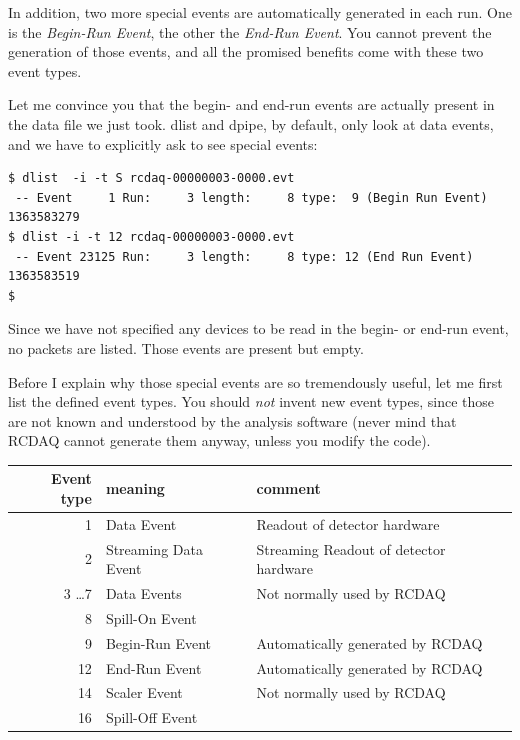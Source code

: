 \documentclass{article}[11pt]
\begin{document}
In addition, two more special events are automatically generated in
each run.  One is the \emph{Begin-Run Event}, the other the
\emph{End-Run Event}. You cannot prevent the generation of those
events, and all the promised benefits come with these two event types.

Let me convince you that the begin- and end-run events are actually present in
the data file we just took. dlist and dpipe, by default, only look at
data events, and we have to explicitly ask to see special events:

\begin{verbatim}
$ dlist  -i -t S rcdaq-00000003-0000.evt
 -- Event     1 Run:     3 length:     8 type:  9 (Begin Run Event)  1363583279
$ dlist -i -t 12 rcdaq-00000003-0000.evt
 -- Event 23125 Run:     3 length:     8 type: 12 (End Run Event)  1363583519
$ 
\end{verbatim}

Since we have not specified any devices to be read in the begin- or end-run event,
no packets are listed. Those events are present but empty.

Before I explain why those special events are so tremendously useful,
let me first list the defined event types. You should \emph{not}
invent new event types, since those are not known and understood by the
analysis software (never mind that RCDAQ cannot generate them anyway,
unless you modify the code).

\begin{center}
\begin{tabular}{|r|l|l|}
\hline
Event type & meaning & comment \\
\hline
\hline
    1 & Data Event &  Readout of detector hardware\\ \hline
    2 & Streaming Data Event &  Streaming Readout of detector hardware\\ \hline
    3 \dots 7 & Data Events & Not normally used by RCDAQ \\ \hline
    8  & Spill-On Event &  \\ \hline
    9  & Begin-Run Event & Automatically generated by RCDAQ \\ \hline
    12 & End-Run Event & Automatically generated by RCDAQ  \\ \hline
    14 & Scaler Event  & Not normally used by RCDAQ \\ \hline
    16 & Spill-Off Event  &  \\ \hline
\hline
\end{tabular}
\end{center}
\end{document}
